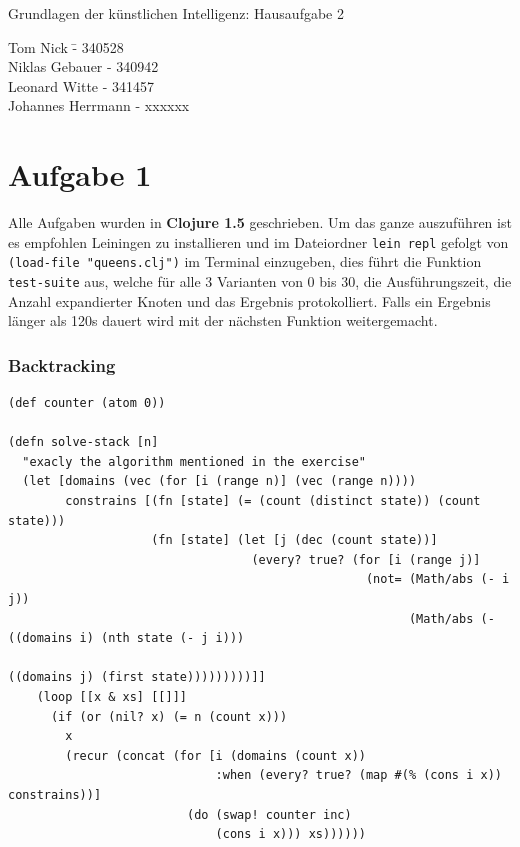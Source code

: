 \documentclass[a4paper,10pt]{article}
\begin{document}
\begin{center}
\Large{Grundlagen der künstlichen Intelligenz: Hausaufgabe 2} \\
\end{center}
\begin{tabbing}
Tom Nick \hspace{2cm}\= - 340528\\
Niklas Gebauer \> - 340942 \\
Leonard Witte \> - 341457 \\
Johannes Herrmann \> - xxxxxx\\
\end{tabbing}

\section*{Aufgabe 1}

Alle Aufgaben wurden in \textbf{Clojure 1.5} geschrieben. Um das ganze auszuführen ist es empfohlen Leiningen zu installieren und im Dateiordner \texttt{lein repl} gefolgt von \texttt{(load-file "queens.clj")} im Terminal einzugeben, dies führt die Funktion \texttt{test-suite} aus, welche für alle 3 Varianten von 0 bis 30, die Ausführungszeit, die Anzahl expandierter Knoten und das Ergebnis protokolliert. Falls ein Ergebnis länger als 120s dauert wird mit der nächsten Funktion weitergemacht.
\subsubsection*{Backtracking}
\begin{lstlisting}
(def counter (atom 0))

(defn solve-stack [n]
  "exacly the algorithm mentioned in the exercise"
  (let [domains (vec (for [i (range n)] (vec (range n))))
        constrains [(fn [state] (= (count (distinct state)) (count state)))
                    (fn [state] (let [j (dec (count state))]
                                  (every? true? (for [i (range j)]
                                                  (not= (Math/abs (- i j))
                                                        (Math/abs (- ((domains i) (nth state (- j i)))
                                                                     ((domains j) (first state)))))))))]]
    (loop [[x & xs] [[]]]
      (if (or (nil? x) (= n (count x)))
        x
        (recur (concat (for [i (domains (count x))
                             :when (every? true? (map #(% (cons i x)) constrains))]
                         (do (swap! counter inc)
                             (cons i x))) xs))))))
\end{lstlisting}
\end{document}
